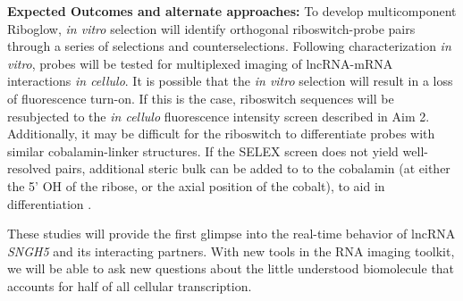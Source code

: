 
\textbf{Expected Outcomes and alternate approaches:}
To develop multicomponent Riboglow, \textit{in vitro} selection will identify orthogonal riboswitch-probe pairs through a series of selections and counterselections.
Following characterization \textit{in vitro}, probes will be tested for multiplexed imaging of lncRNA-mRNA interactions \textit{in cellulo}. It is possible that the \textit{in vitro} selection will result in a loss of fluorescence turn-on. If this is the case, riboswitch sequences will be resubjected to the \textit{in cellulo} fluorescence intensity screen described in Aim 2.
Additionally, it may be difficult for the riboswitch to differentiate probes with similar cobalamin-linker structures. If the SELEX screen does not yield well-resolved pairs, additional steric bulk can be added to to the cobalamin (at either the 5' OH of the ribose, or the axial position of the cobalt), to aid in differentiation \cite{ChrominskiVitaminB12Derivatives2014}.

These studies will provide the first glimpse into the real-time behavior of lncRNA \textit{SNGH5} and its interacting partners. With new tools in the RNA imaging toolkit, we will be able to ask new questions about the little understood biomolecule that accounts for half of all cellular transcription.

